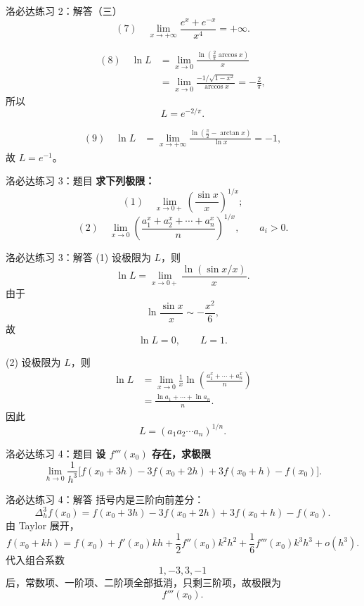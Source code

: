\documentclass[aspectratio=169,11pt]{ctexbeamer}
\begin{document}
\begin{frame}{洛必达练习 2：解答（三）}
\small
\[
(7)\quad
\lim_{x\to+\infty}\frac{e^x+e^{-x}}{x^4}=+\infty.
\]

\[
\begin{aligned}
(8)\quad
\ln L
&=\lim_{x\to0}\frac{\ln\left(\frac2\pi\arccos x\right)}{x}\\
&=\lim_{x\to0}
\frac{-1/\sqrt{1-x^2}}{\arccos x}
=-\frac2\pi,
\end{aligned}
\]
所以
\[
  L=e^{-2/\pi}.
\]

\[
\begin{aligned}
(9)\quad
\ln L
&=\lim_{x\to+\infty}
\frac{\ln\left(\frac\pi2-\arctan x\right)}{\ln x}
=-1,
\end{aligned}
\]
故 $L=e^{-1}$。
\end{frame}

\begin{frame}{洛必达练习 3：题目}
\small
\textbf{求下列极限：}
\[
  (1)\quad
  \lim_{x\to0+}\left(\frac{\sin x}{x}\right)^{1/x};
\]
\[
  (2)\quad
  \lim_{x\to0}
  \left(\frac{a_1^x+a_2^x+\cdots+a_n^x}{n}\right)^{1/x},
  \qquad a_i>0.
\]
\end{frame}

\begin{frame}{洛必达练习 3：解答}
\small
(1) 设极限为 $L$，则
\[
  \ln L
  =
  \lim_{x\to0+}\frac{\ln(\sin x/x)}{x}.
\]
由于
\[
  \ln\frac{\sin x}{x}\sim -\frac{x^2}{6},
\]
故
\[
  \ln L=0,\qquad L=1.
\]

(2) 设极限为 $L$，则
\[
\begin{aligned}
\ln L
&=\lim_{x\to0}
\frac1x\ln\left(\frac{a_1^x+\cdots+a_n^x}{n}\right)\\
&=
\frac{\ln a_1+\cdots+\ln a_n}{n}.
\end{aligned}
\]
因此
\[
  L=(a_1a_2\cdots a_n)^{1/n}.
\]
\end{frame}

\begin{frame}{洛必达练习 4：题目}
\small
\textbf{设 $f'''(x_0)$ 存在，求极限}
\[
  \lim_{h\to0}
  \frac{1}{h^3}
  \bigl[
  f(x_0+3h)-3f(x_0+2h)+3f(x_0+h)-f(x_0)
  \bigr].
\]
\end{frame}

\begin{frame}{洛必达练习 4：解答}
\small
括号内是三阶向前差分：
\[
  \Delta_h^3 f(x_0)
  =
  f(x_0+3h)-3f(x_0+2h)+3f(x_0+h)-f(x_0).
\]
由 Taylor 展开，
\[
  f(x_0+kh)
  =
  f(x_0)+f'(x_0)kh+\frac12f''(x_0)k^2h^2
  +\frac16f'''(x_0)k^3h^3+o(h^3).
\]
代入组合系数
\[
  1,-3,3,-1
\]
后，常数项、一阶项、二阶项全部抵消，只剩三阶项，故极限为
\[
  f'''(x_0).
\]
\end{frame}
\end{document}
